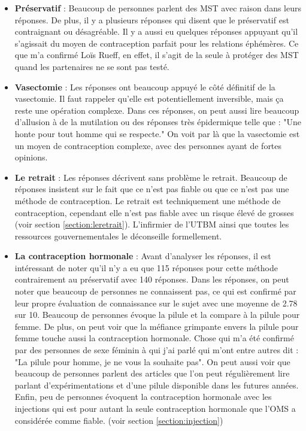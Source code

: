 \documentclass[12pt,a4paper]{report}
\begin{document}
\begin{itemize}
    \item \textbf{Préservatif} : Beaucoup de personnes parlent des MST avec raison dans leurs réponses. De plus, il y a plusieurs réponses qui disent que le préservatif est contraignant ou désagréable. Il y a aussi eu quelques réponses appuyant qu'il s'agissait du moyen de contraception parfait pour les relations éphémères. Ce que m'a confirmé Loïs Rueff, en effet, il s'agit de la seule à protéger des MST quand les partenaires ne se sont pas testé.
    
    \item \textbf{Vasectomie} : Les réponses ont beaucoup appuyé le côté définitif de la vasectomie. Il faut rappeler qu'elle est potentiellement inversible, mais ça reste une opération complexe. Dans ces réponses, on peut aussi lire beaucoup d'allusion à de la mutilation ou des réponses très épidermique telle que : "Une honte pour tout homme qui se respecte."
    On voit par là que la vasectomie est un moyen de contraception complexe, avec des personnes ayant de fortes opinions.
    
    \item \textbf{Le retrait} : Les réponses décrivent sans problème le retrait. Beaucoup de réponses insistent sur le fait que ce n'est pas fiable ou que ce n'est pas une méthode de contraception. Le retrait est techniquement une méthode de contraception, cependant elle n'est pas fiable avec un risque élevé de grosses (voir section \ref{section:leretrait}). L'infirmier de l'UTBM ainsi que toutes les ressources gouvernementales le déconseille formellement.

    \item \textbf{La contraception hormonale} : Avant d'analyser les réponses, il est intéressant de noter qu'il n'y a eu que 115 réponses pour cette méthode contrairement au préservatif avec 140 réponses. Dans les réponses, on peut noter que beaucoup de personnes ne connaissent pas, ce qui est confirmé par leur propre évaluation de connaissance sur le sujet avec une moyenne de 2.78 sur 10. Beaucoup de personnes évoque la pilule et la compare à la pilule pour femme. De plus, on peut voir que la méfiance grimpante envers la pilule pour femme \cite{albrechtQuelleEstPlace2023} touche aussi la contraception hormonale. Chose qui m'a été confirmé par des personnes de sexe féminin à qui j'ai parlé qui m'ont entre autres dit : "La pilule pour homme, je ne vous la souhaite pas". On peut aussi voir que beaucoup de personnes parlent des articles que l'on peut régulièrement lire parlant d'expérimentations et d'une pilule disponible dans les futures années. Enfin, peu de personnes évoquent la contraception hormonale avec les injections qui est pour autant la seule contraception hormonale que l'OMS a considérée comme fiable. (voir section \ref{section:injection})


\end{itemize}
\end{document}
